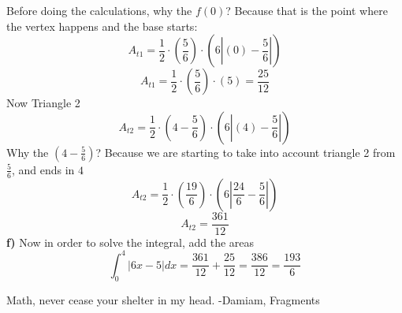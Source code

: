 \documentclass[12pt, letterpaper]{article}
\begin{document}
Before doing the calculations, why the \(f(0)\)? Because that is the point where the vertex happens and the base starts:
\[A_{t1} = \frac{1}{2}\cdot \left( \frac{5}{6} \right) \cdot \left( 6|(0)-\frac{5}{6}| \right)\]
\[A_{t1} = \frac{1}{2}\cdot \left( \frac{5}{6} \right) \cdot (5) = \frac{25}{12}\]
Now Triangle 2
\[A_{t2} = \frac{1}{2}\cdot \left( 4 - \frac{5}{6} \right) \cdot \left( 6|(4)-\frac{5}{6}| \right)\]
Why the \(\left( 4 - \frac{5}{6} \right)\)? Because we are starting to take into account triangle 2 from \(\frac{5}{6}\), and ends in \(4\)
\[A_{t2} = \frac{1}{2}\cdot \left( \frac{19}{6} \right) \cdot \left( 6|\frac{24}{6} - \frac{5}{6}| \right)\]
\[A_{t2} = \frac{361}{12}\]
\textbf{f)} Now in order to solve the integral, add the areas
\[\int_{0}^{4} |6x-5|dx = \frac{361}{12} + \frac{25}{12} = \frac{386}{12} = \frac{193}{6}\]

Math, never cease your shelter in my head. 
-Damiam, Fragments
\end{document}
